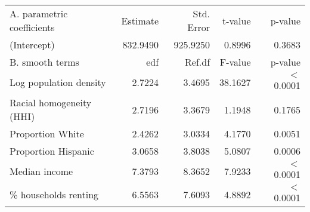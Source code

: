 \begin{table}[ht]
\centering
\begin{tabular}{lrrrr}
   \hline
A. parametric coefficients & Estimate & Std. Error & t-value & p-value \\ 
  (Intercept) & 832.9490 & 925.9250 & 0.8996 & 0.3683 \\ 
   \hline
B. smooth terms & edf & Ref.df & F-value & p-value \\ 
  Log population density & 2.7224 & 3.4695 & 38.1627 & $<$ 0.0001 \\ 
  Racial homogeneity (HHI) & 2.7196 & 3.3679 & 1.1948 & 0.1765 \\ 
  Proportion White & 2.4262 & 3.0334 & 4.1770 & 0.0051 \\ 
  Proportion Hispanic & 3.0658 & 3.8038 & 5.0807 & 0.0006 \\ 
  Median income & 7.3793 & 8.3652 & 7.9233 & $<$ 0.0001 \\ 
  \% households renting & 6.5563 & 7.6093 & 4.8892 & $<$ 0.0001 \\ 
   \hline
\end{tabular}
\caption{ } 
\label{Demographic GAM}
\end{table}
